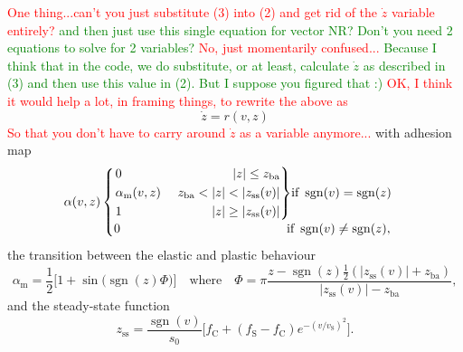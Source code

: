 \documentclass{article}
\newenvironment{rcases}
  {\left.\begin{alignedat}{2}}
  {\end{alignedat}\right\rbrace}
\DeclareMathOperator{\sgn}{sgn}
\def\SBcomment[#1]{\textcolor{Red}{#1}}
\def\SWcomment[#1]{\textcolor{Green}{#1}}
\begin{document}
\SBcomment[One thing...can't you just substitute (3) into (2) and get rid of the $\dot{z}$ variable entirely?]\SWcomment[ and then just use this single equation for vector NR? Don't you need 2 equations to solve for 2 variables?]{}
\SBcomment[No, just momentarily confused...] \SWcomment[Because I think that in the code, we do substitute, or at least, calculate $\dot{z}$ as described in (3) and then use this value in (2). But I suppose you figured that :)]{}
\SBcomment[OK, I think it would help a lot, in framing things, to rewrite the above as]
\begin{equation}
    \dot{z} = r(v,z)
\end{equation}
\SBcomment[So that you don't have to carry around $\dot{z}$ as a variable anymore...]
with adhesion map
\begin{equation}\label{eq:alpha}
\alpha(v, z) 
    \begin{cases}
    \begin{rcases}
        &0 & |z| \leq z_\text{ba}\\
       &\alpha_\text{m}(v,z)&\quad \  z_\text{ba}<|z|<|z_\text{ss}(v)|\\
        &1 &|z|\geq |z_\text{ss}(v)|
        \end{rcases}\text{if}\  \sgn(v)=\sgn(z)\\
        0\qquad \qquad \qquad \qquad \qquad \qquad \quad \, \text{if}\  \sgn(v)\neq\sgn(z),
    \end{cases}
\end{equation}
the transition between the elastic and plastic behaviour
\begin{equation}
    \alpha_\text{m} = \frac{1}{2}\big[1+\sin\big(\sgn(z)\Phi\big)\big]\quad \text{where}\quad \Phi = \pi\frac{z-\sgn(z)\frac{1}{2}(|z_\text{ss}(v)|+z_\text{ba})}{|z_\text{ss}(v)|-z_\text{ba}},
\end{equation}
and the steady-state function
\begin{equation}\label{eq:zss}
    z_\text{ss} = \frac{\sgn(v)}{s_0}\Big[f_\text{C}+(f_\text{S}-f_\text{C})e^{-(v/v_\text{S})^2}\Big].
\end{equation}
\end{document}
